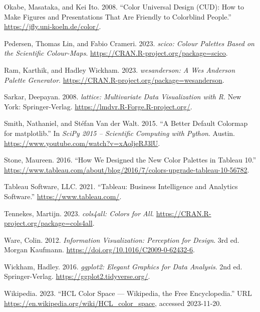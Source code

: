 \begin{CSLReferences}{1}{0}
\leavevmode{}%
Okabe, Masataka, and Kei Ito. 2008. {``Color Universal Design ({CUD}): How to Make Figures and Presentations That Are Friendly to Colorblind People.''} \url{https://jfly.uni-koeln.de/color/}.

\leavevmode{}%
Pedersen, Thomas Lin, and Fabio Crameri. 2023. \emph{{scico}: Colour Palettes Based on the Scientific Colour-Maps}. \url{https://CRAN.R-project.org/package=scico}.

\leavevmode{}%
Ram, Karthik, and Hadley Wickham. 2023. \emph{{wesanderson}: A {W}es {A}nderson Palette Generator}. \url{https://CRAN.R-project.org/package=wesanderson}.

\leavevmode{}%
Sarkar, Deepayan. 2008. \emph{{lattice}: Multivariate Data Visualization with {R}}. New York: Springer-Verlag. \url{https://lmdvr.R-Forge.R-project.org/}.

\leavevmode{}%
Smith, Nathaniel, and Stéfan Van der Walt. 2015. {``A Better Default Colormap for {matplotlib}.''} In \emph{SciPy 2015 -- Scientific Computing with {Python}}. Austin. \url{https://www.youtube.com/watch?v=xAoljeRJ3lU}.

\leavevmode{}%
Stone, Maureen. 2016. {``How We Designed the New Color Palettes in {Tableau} 10.''} \url{https://www.tableau.com/about/blog/2016/7/colors-upgrade-tableau-10-56782}.

\leavevmode{}%
Tableau Software, LLC. 2021. {``{Tableau}: Business Intelligence and Analytics Software.''} \url{https://www.tableau.com/}.

\leavevmode{}%
Tennekes, Martijn. 2023. \emph{{cols4all}: Colors for All}. \url{https://CRAN.R-project.org/package=cols4all}.

\leavevmode{}%
Ware, Colin. 2012. \emph{Information Visualization: Perception for Design}. 3rd ed. Morgan Kaufmann. \url{https://doi.org/10.1016/C2009-0-62432-6}.

\leavevmode{}%
Wickham, Hadley. 2016. \emph{{ggplot2}: Elegant Graphics for Data Analysis}. 2nd ed. Springer-Verlag. \url{https://ggplot2.tidyverse.org/}.

\leavevmode{}%
Wikipedia. 2023. {``{HCL Color Space} --- {W}ikipedia{,} the Free Encyclopedia.''} URL \url{https://en.wikipedia.org/wiki/HCL_color_space}, accessed 2023-11-20.


\end{CSLReferences}
